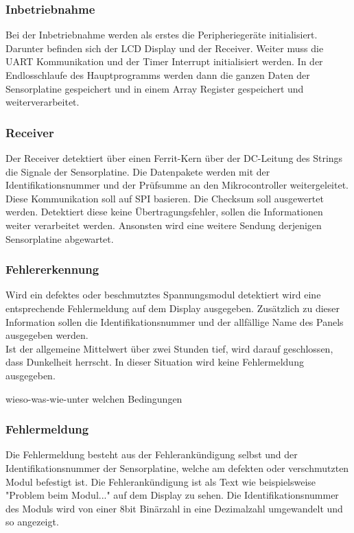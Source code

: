 \subsubsection{Inbetriebnahme}
Bei der Inbetriebnahme werden als erstes die Peripheriegeräte initialisiert. Darunter befinden sich der LCD Display und der Receiver. Weiter muss die UART Kommunikation und der Timer Interrupt initialisiert werden. In der Endlosschlaufe des Hauptprogramms werden dann die ganzen Daten der Sensorplatine gespeichert und in einem Array Register gespeichert und weiterverarbeitet.

\subsubsection{Receiver}
Der Receiver detektiert über einen Ferrit-Kern über der DC-Leitung des Strings die Signale der Sensorplatine. Die Datenpakete werden mit der Identifikationsnummer und der Prüfsumme an den Mikrocontroller weitergeleitet. Diese Kommunikation soll auf SPI basieren. Die Checksum soll ausgewertet werden. Detektiert diese keine Übertragungsfehler, sollen die Informationen weiter verarbeitet werden. Ansonsten wird eine weitere Sendung derjenigen Sensorplatine abgewartet. \\

\subsubsection{Fehlererkennung}
Wird ein defektes oder beschmutztes Spannungsmodul detektiert wird eine entsprechende Fehlermeldung auf dem Display ausgegeben. Zusätzlich zu dieser Information sollen die Identifikationsnummer und der allfällige Name des Panels ausgegeben werden. \\
Ist der allgemeine Mittelwert über zwei Stunden tief, wird darauf geschlossen, dass Dunkelheit herrscht. In dieser Situation wird keine Fehlermeldung ausgegeben.



wieso-was-wie-unter welchen Bedingungen
\subsubsection{Fehlermeldung}
Die Fehlermeldung besteht aus der Fehlerankündigung selbst und der Identifikationsnummer der Sensorplatine, welche am defekten oder verschmutzten Modul befestigt ist. Die Fehlerankündigung ist als Text wie beispielsweise "Problem beim Modul..." auf dem Display zu sehen. Die Identifikationsnummer des Moduls wird von einer 8bit Binärzahl in eine Dezimalzahl umgewandelt und so angezeigt.

